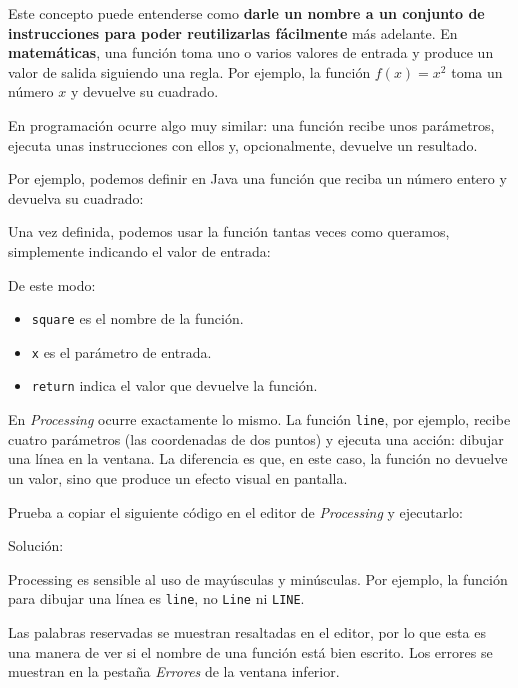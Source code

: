 \documentclass[
  spanish,
  11pt,
  a4paper,
  DIV=11,
  numbers=noendperiod]{scrartcl}
\providecommand{\tightlist}{%
  \setlength{\itemsep}{0pt}\setlength{\parskip}{0pt}}
\begin{document}
Este concepto puede entenderse como \textbf{darle un nombre a un conjunto de instrucciones para poder reutilizarlas fácilmente} más adelante. En \textbf{matemáticas}, una función toma uno o varios valores de entrada y produce un valor de salida siguiendo una regla. Por ejemplo, la función \(f(x) = x^2\) toma un número \(x\) y devuelve su cuadrado.

En programación ocurre algo muy similar: una función recibe unos parámetros, ejecuta unas instrucciones con ellos y, opcionalmente, devuelve un resultado.

Por ejemplo, podemos definir en Java una función que reciba un número entero y devuelva su cuadrado:


Una vez definida, podemos usar la función tantas veces como queramos, simplemente indicando el valor de entrada:


De este modo:

\begin{itemize}
\tightlist
\item
  \texttt{square} es el nombre de la función.
\item
  \texttt{x} es el parámetro de entrada.
\item
  \texttt{return} indica el valor que devuelve la función.
\end{itemize}

En \emph{Processing} ocurre exactamente lo mismo. La función \texttt{line}, por ejemplo, recibe cuatro parámetros (las coordenadas de dos puntos) y ejecuta una acción: dibujar una línea en la ventana. La diferencia es que, en este caso, la función no devuelve un valor, sino que produce un efecto visual en pantalla.

\begin{tcolorbox}[enhanced jigsaw, toprule=.15mm, coltitle=black, titlerule=0mm, opacitybacktitle=0.6, breakable, colback=white, colframe=quarto-callout-warning-color-frame, colbacktitle=quarto-callout-warning-color!10!white, opacityback=0, title={Ejercicio 2 - Errores comunes}, bottomtitle=1mm, rightrule=.15mm, toptitle=1mm, left=2mm, bottomrule=.15mm, leftrule=.75mm, arc=.35mm]

Prueba a copiar el siguiente código en el editor de \emph{Processing} y ejecutarlo:


Solución:

Processing es sensible al uso de mayúsculas y minúsculas. Por ejemplo, la función para dibujar una línea es \texttt{line}, no \texttt{Line} ni \texttt{LINE}.

Las palabras reservadas se muestran {resaltadas} en el editor, por lo que esta es una manera de ver si el nombre de una función está bien escrito. Los {errores} se muestran en la pestaña \emph{Errores} de la ventana inferior.

\end{tcolorbox}
\end{document}
